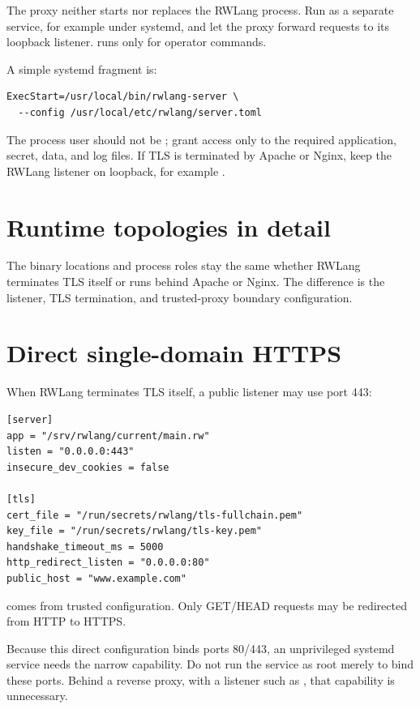 The proxy neither starts nor replaces the RWLang process. Run  as a separate service, for example under systemd, and let the proxy forward requests to its loopback listener.  runs only for operator commands.

A simple systemd  fragment is:

\begin{lstlisting}
ExecStart=/usr/local/bin/rwlang-server \
  --config /usr/local/etc/rwlang/server.toml
\end{lstlisting}

The process user should not be ; grant access only to the required application, secret, data, and log files. If TLS is terminated by Apache or Nginx, keep the RWLang listener on loopback, for example .

\section{Runtime topologies in detail}

The binary locations and process roles stay the same whether RWLang terminates TLS itself or runs behind Apache or Nginx. The difference is the listener, TLS termination, and trusted-proxy boundary configuration.

\section{Direct single-domain HTTPS}

When RWLang terminates TLS itself, a public listener may use port 443:

\begin{lstlisting}
[server]
app = "/srv/rwlang/current/main.rw"
listen = "0.0.0.0:443"
insecure_dev_cookies = false

[tls]
cert_file = "/run/secrets/rwlang/tls-fullchain.pem"
key_file = "/run/secrets/rwlang/tls-key.pem"
handshake_timeout_ms = 5000
http_redirect_listen = "0.0.0.0:80"
public_host = "www.example.com"
\end{lstlisting}

 comes from trusted configuration. Only GET/HEAD requests may be redirected from HTTP to HTTPS.

Because this direct configuration binds ports 80/443, an unprivileged systemd service needs the narrow  capability. Do not run the service as root merely to bind these ports. Behind a reverse proxy, with a listener such as , that capability is unnecessary.

